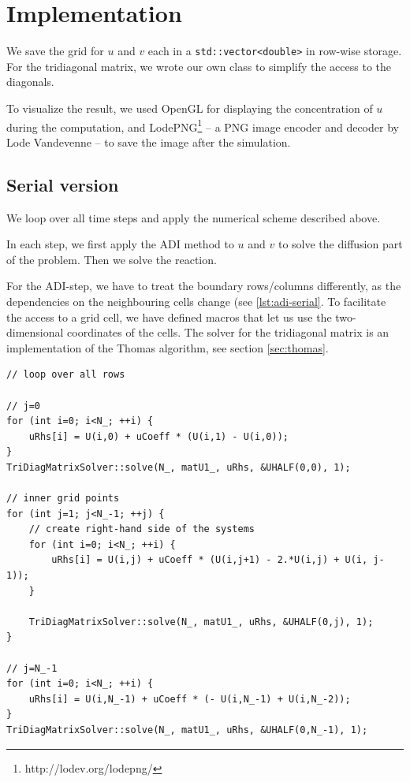 \documentclass[a4paper]{article}
\begin{document}
\section{Implementation}

We save the grid for $u$ and $v$ each in a \verb+std::vector<double>+ in row-wise storage.
For the tridiagonal matrix, we wrote our own class to simplify the access to the diagonals.

To visualize the result, we used OpenGL for displaying the concentration of $u$ during the computation, and LodePNG\footnote{http://lodev.org/lodepng/} -- a PNG image encoder and decoder by Lode Vandevenne -- to save the image after the simulation.

\subsection{Serial version}

We loop over all time steps and apply the numerical scheme described above.



In each step, we first apply the ADI method to $u$ and $v$ to solve the diffusion part of the problem.
Then we solve the reaction.

For the ADI-step, we have to treat the boundary rows/columns differently, as the dependencies on the neighbouring cells change (see \ref{lst:adi-serial}.
To facilitate the access to a grid cell, we have defined macros that let us use the two-dimensional coordinates of the cells.
The solver for the tridiagonal matrix is an implementation of the Thomas algorithm, see section \ref{sec:thomas}.


\begin{lstlisting}[label={lst:adi-serial}, caption={Serial implementation of the first half-step (the computations for $v$ are omitted as they are analogue to the computation for $u$)}, float]
// loop over all rows

// j=0
for (int i=0; i<N_; ++i) {
    uRhs[i] = U(i,0) + uCoeff * (U(i,1) - U(i,0));
}
TriDiagMatrixSolver::solve(N_, matU1_, uRhs, &UHALF(0,0), 1);

// inner grid points
for (int j=1; j<N_-1; ++j) {
    // create right-hand side of the systems
    for (int i=0; i<N_; ++i) {
        uRhs[i] = U(i,j) + uCoeff * (U(i,j+1) - 2.*U(i,j) + U(i, j-1));
    }
    
    TriDiagMatrixSolver::solve(N_, matU1_, uRhs, &UHALF(0,j), 1);
}

// j=N_-1
for (int i=0; i<N_; ++i) {
    uRhs[i] = U(i,N_-1) + uCoeff * (- U(i,N_-1) + U(i,N_-2));
}
TriDiagMatrixSolver::solve(N_, matU1_, uRhs, &UHALF(0,N_-1), 1);
\end{lstlisting}
\end{document}
